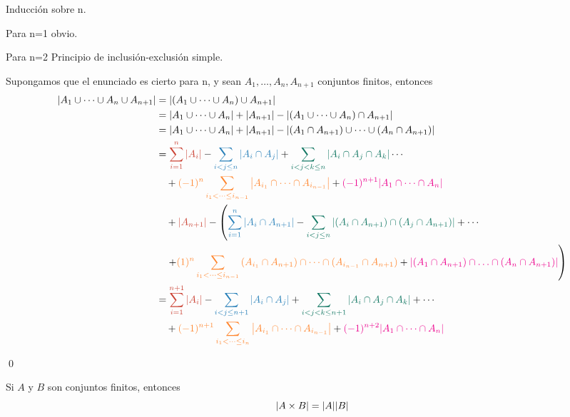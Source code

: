 	\begin{demostration}
		Inducción sobre n.
		
		Para n=1 obvio.
		
		Para n=2 Principio de inclusión-exclusión simple.
		
		Supongamos que el enunciado es cierto para n, y sean $A_1,\dotso,A_n,A_{n+1}$ conjuntos finitos, entonces
		\begin{align*}
			\abs{A_1\cup\dotsb\cup A_n\cup A_{n+1}}&=\abs{(A_1\cup\dotsb\cup A_n)\cup A_{n+1}} \\
			&=\abs{A_1\cup\dotsb\cup A_n}+\abs{A_{n+1}}-\abs{(A_1\cup\dotsb\cup A_n)\cap A_{n+1}} \\
			&=\abs{A_1\cup\dotsb\cup A_n}+\abs{A_{n+1}}-\abs{(A_1\cap A_{n+1})\cup\dotsb\cup(A_n\cap A_{n+1})}\\
			&= \textcolor{Rojop}{\sum_{i=1}^{n}{\abs{A_i}}}
			-\textcolor{Azulp}{\sum_{i< j\leq n}{\abs{A_i\cap A_j}}}
			+\textcolor{Verdep}{\sum_{i< j< k\leq n}{\abs{A_i\cap A_j\cap A_k}}}\dotsb\\
			&\quad+\textcolor{ORANGEmanim}{(-1)^n\sum_{i_1< \dotsb\leq i_{n-1}}{\abs{A_{i_1}\cap\dotsb\cap A_{i_{n-1}}}}}
			+\textcolor{magenta}{(-1)^{n+1}\abs{A_1\cap\dotsb\cap A_n}}\\
			&\quad+\textcolor{Rojop}{\abs{A_{n+1}}}
			-\left(\textcolor{Azulp}{\sum_{i=1}^{n}{\abs{A_i\cap A_{n+1}}}}
			-\textcolor{Verdep}{\sum_{i<j\le n}{\abs{(A_i\cap A_{n+1})\cap(A_j\cap A_{n+1})}}}+\dotsb\right.\\
			&\quad\left.+\textcolor{ORANGEmanim}{(1)^{n}\sum_{i_1<\dotsb\leq i_{n-1}}{(A_{i_1}\cap A_{n+1})\cap\dotsb\cap(A_{i_{n-1}}\cap A_{n+1})}}
			+\textcolor{magenta}{\abs{(A_1\cap A_{n+1})\cap\dotso\cap(A_n\cap A_{n+1})}}\right)\\
			&=\textcolor{Rojop}{\sum_{i=1}^{n+1}{\abs{A_i}}}
			-\textcolor{Azulp}{\sum_{i<j\le n+1}{\abs{A_i\cap A_j}}}
			+\textcolor{Verdep}{\sum_{i< j< k\leq n+1}{\abs{A_i\cap A_j\cap A_k}}}+\dotsb\\
			&\quad+\textcolor{ORANGEmanim}{(-1)^{n+1}\sum_{i_1< \dotsb\leq i_{n}}{\abs{A_{i_1}\cap\dotsb\cap A_{i_{n-1}}}}}
			+\textcolor{magenta}{(-1)^{n+2}\abs{A_1\cap\dotsb\cap A_n}}
		\end{align*}
		\begin{flushright}
			\qed
		\end{flushright}
	\end{demostration}
	\begin{theorem}{}
		Si $A$ y $B$ son conjuntos finitos, entonces
		$$\abs{A\times B}=\abs{A}\abs{B}$$
	\end{theorem}
